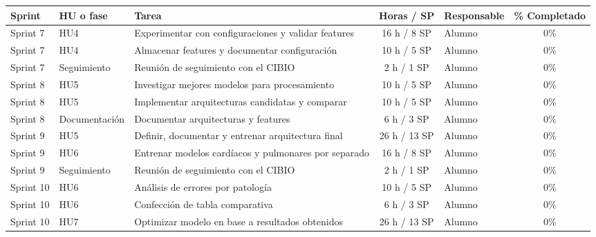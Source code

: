 \documentclass[
11pt, %
]{charter}
\begin{document}
\begin{table}[htpb]
\centering
\begin{tabularx}{\linewidth}{@{}|l|l|X|c|l|c|@{}}
\hline
\rowcolor[HTML]{C0C0C0}
Sprint & HU o fase & Tarea & Horas / SP & Responsable & \% Completado \\ \hline
Sprint 7 & HU4 & Experimentar con configuraciones y validar features & 16 h / 8 SP & Alumno & 0\% \\ \hline
Sprint 7 & HU4 & Almacenar features y documentar configuración & 10 h / 5 SP & Alumno & 0\% \\ \hline
Sprint 7 & Seguimiento & Reunión de seguimiento con el CIBIO & 2 h / 1 SP & Alumno & 0\% \\ \hline
Sprint 8 & HU5 & Investigar mejores modelos para procesamiento & 10 h / 5 SP & Alumno & 0\% \\ \hline
Sprint 8 & HU5 & Implementar arquitecturas candidatas y comparar & 10 h / 5 SP & Alumno & 0\% \\ \hline
Sprint 8 & Documentación & Documentar arquitecturas y features & 6 h / 3 SP & Alumno & 0\% \\ \hline
Sprint 9 & HU5 & Definir, documentar y entrenar arquitectura final & 26 h / 13 SP & Alumno & 0\% \\ \hline
Sprint 9 & HU6 & Entrenar modelos cardíacos y pulmonares por separado & 16 h / 8 SP & Alumno & 0\% \\ \hline
Sprint 9 & Seguimiento & Reunión de seguimiento con el CIBIO & 2 h / 1 SP & Alumno & 0\% \\ \hline
Sprint 10 & HU6 & Análisis de errores por patología & 10 h / 5 SP & Alumno & 0\% \\ \hline
Sprint 10 & HU6 & Confección de tabla comparativa & 6 h / 3 SP & Alumno & 0\% \\ \hline
Sprint 10 & HU7 & Optimizar modelo en base a resultados obtenidos & 26 h / 13 SP & Alumno & 0\% \\ \hline
\end{tabularx}
\end{table}
\end{document}
